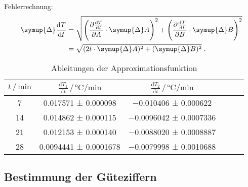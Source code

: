 Fehlerrechnung:
\begin{align*}
  \symup{\Delta} \frac{\mathrm{d}T}{\mathrm{d}t}
  &= \sqrt{\left(\frac{\partial \frac{\mathrm{d}T}{\mathrm{d}t}}{\partial A} \cdot \symup{\Delta} A\right)^2 + \left(\frac{\partial \frac{\mathrm{d}T}{\mathrm{d}t}}{\partial B} \cdot \symup{\Delta} B\right)^2} \\
  &= \sqrt{(2t \cdot \symup{\Delta} A)^2 + (\symup{\Delta} B)^2} \; .
\end{align*}

\begin{table}
\centering
\caption{Ableitungen der Approximationsfunktion}
\label{tab:derivatives}
\begin{tabular}{c c c c c c}
\toprule
$t \,/\, \si{\minute}$ &
$\frac{\mathrm{d}T_1}{\mathrm{d}t} \,/\, \si{\celsius\per\minute}$ &
$\frac{\mathrm{d}T_2}{\mathrm{d}t} \,/\, \si{\celsius\per\minute}$ \\
\midrule
7  & \num{0.017571}  ± \num{0.000098}  & \num{-0.010406}  ± \num{0.000622} \\
14 & \num{0.014862}  ± \num{0.000115}  & \num{-0.0096042} ± \num{0.0007336} \\
21 & \num{0.012153}  ± \num{0.000140}  & \num{-0.0088020} ± \num{0.0008887} \\
28 & \num{0.0094441} ± \num{0.0001678} & \num{-0.0079998} ± \num{0.0010688} \\



\bottomrule
\end{tabular}
\end{table}


\subsection{Bestimmung der Güteziffern} %
\label{sec:auswertung_gueteziffern}

